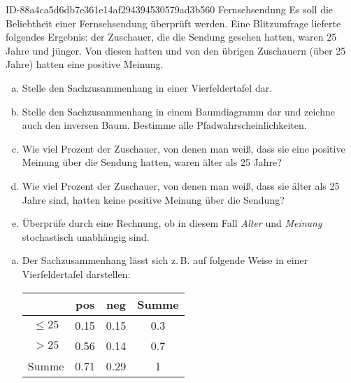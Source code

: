 \begin{exercise}
      {ID-88a4ca5d6db7e361e14af294394530579ad3b560}
      {Fernsehsendung}
  \ifproblem\problem
    Es soll die Beliebtheit einer Fernsehsendung überprüft werden.
    Eine Blitzumfrage lieferte folgendes Ergebnis:  der Zuschauer,
    die die Sendung gesehen hatten, waren 25 Jahre und jünger.
    Von diesen hatten  und von den übrigen Zuschauern (über 25
    Jahre) hatten  eine positive Meinung.
    \begin{enumerate}[a)]
      \item Stelle den Sachzusammenhang in einer Vierfeldertafel dar.
      \item Stelle den Sachzusammenhang in einem Baumdiagramm dar und
            zeichne auch den inversen Baum. Bestimme alle Pfadwahrscheinlichkeiten.
      \item Wie viel Prozent der Zuschauer, von denen man weiß, dass sie
            eine positive Meinung über die Sendung hatten, waren älter
            als 25 Jahre?
      \item Wie viel Prozent der Zuschauer, von denen man weiß, dass sie
            älter als 25 Jahre sind, hatten keine positive Meinung über
            die Sendung?
      \item Überprüfe durch eine Rechnung, ob in diesem Fall \textit{Alter} und
            \textit{Meinung} stochastisch unabhängig sind.
    \end{enumerate}
  \fi
  \ifoutcome\outcome
    \begin{enumerate}[a)]
      \item Der Sachzusammenhang lässt sich z.\,B. auf folgende Weise in
            einer Vierfeldertafel darstellen:
            \begin{center}
              \begin{tabular}{|c||c|c||c|}
                \hline
                         & pos        & neg        & Summe     \\
                \hline
                \hline
                $\leq25$ & \num{0.15} & \num{0.15} & \num{0.3} \\
                \hline
                $>25$    & \num{0.56} & \num{0.14} & \num{0.7} \\
                \hline
                \hline
                Summe    & \num{0.71} & \num{0.29} & \num{1}   \\
                \hline
              \end{tabular}
            \end{center}

\end{enumerate}
\end{exercise}
